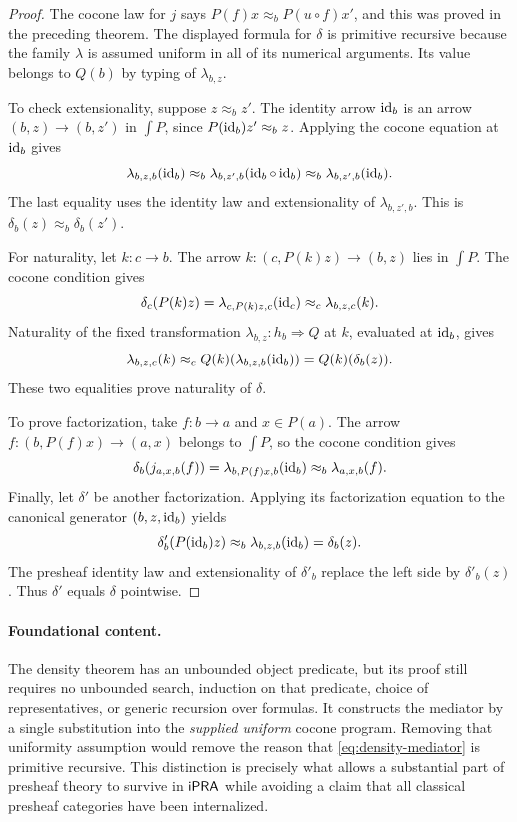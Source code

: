 \begin{proof}
The cocone law for $j$ says
$P(f)x\approx_b P(u\circ f)x'$, and this was proved in the preceding theorem.
The displayed formula for $\delta$ is primitive recursive because the family
$\lambda$ is assumed uniform in all of its numerical arguments.  Its value
belongs to $Q(b)$ by typing of $\lambda_{b,z}$.

To check extensionality, suppose $z\approx_b z'$.  The identity arrow
$\operatorname{id}_b$ is an arrow $(b,z)\to(b,z')$ in $\int P$, since
$P(\operatorname{id}_b)z'\approx_b z$.  Applying the cocone equation at $\operatorname{id}_b$ gives
\[
 \lambda_{b,z,b}(\operatorname{id}_b)\approx_b
 \lambda_{b,z',b}(\operatorname{id}_b\circ\operatorname{id}_b)
 \approx_b\lambda_{b,z',b}(\operatorname{id}_b).
\]
The last equality uses the identity law and extensionality of
$\lambda_{b,z',b}$.  This is $\delta_b(z)\approx_b\delta_b(z')$.

For naturality, let $k:c\to b$.  The arrow
$k:(c,P(k)z)\to(b,z)$ lies in $\int P$.  The cocone condition gives
\[
 \delta_c(P(k)z)=\lambda_{c,P(k)z,c}(\operatorname{id}_c)
 \approx_c\lambda_{b,z,c}(k).
\]
Naturality of the fixed transformation $\lambda_{b,z}:h_b\Rightarrow Q$
at $k$, evaluated at $\operatorname{id}_b$, gives
\[
 \lambda_{b,z,c}(k)\approx_c
 Q(k)(\lambda_{b,z,b}(\operatorname{id}_b))=Q(k)(\delta_b(z)).
\]
These two equalities prove naturality of $\delta$.

To prove factorization, take $f:b\to a$ and $x\in P(a)$.  The arrow
$f:(b,P(f)x)\to(a,x)$ belongs to $\int P$, so the cocone condition gives
\[
 \delta_b(j_{a,x,b}(f))
 =\lambda_{b,P(f)x,b}(\operatorname{id}_b)
 \approx_b\lambda_{a,x,b}(f).
\]
Finally, let $\delta'$ be another factorization.  Applying its factorization
equation to the canonical generator $(b,z,\operatorname{id}_b)$ yields
\[
 \delta'_b(P(\operatorname{id}_b)z)\approx_b\lambda_{b,z,b}(\operatorname{id}_b)=\delta_b(z).
\]
The presheaf identity law and extensionality of $\delta'_b$ replace the
left side by $\delta'_b(z)$.  Thus $\delta'$ equals $\delta$ pointwise.
\end{proof}

\paragraph{Foundational content.}
The density theorem has an unbounded object predicate, but its proof still
requires no unbounded search, induction on that predicate, choice of
representatives, or generic recursion over formulas.  It constructs the
mediator by a single substitution into the \emph{supplied uniform} cocone
program.  Removing that uniformity assumption would remove the reason that
\eqref{eq:density-mediator} is primitive recursive.  This distinction is
precisely what allows a substantial part of presheaf theory to survive in
$\mathsf{iPRA}$ while avoiding a claim that all classical presheaf categories have
been internalized.
